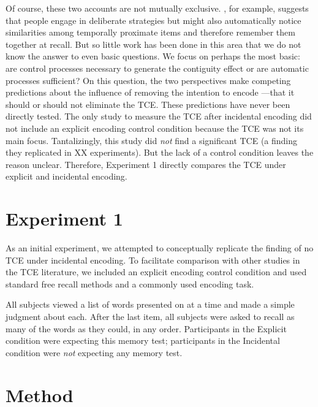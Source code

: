 \documentclass[jou,natbib,floatsintext]{apa6} %
\begin{document}
Of course, these two accounts are not mutually exclusive. \citet{Hint16}, for example, suggests that people engage in deliberate strategies but might also automatically notice similarities among temporally proximate items and therefore remember them together at recall. But so little work has been done in this area that we do not know the answer to even basic questions. We focus on perhaps the most basic: are control processes necessary to generate the contiguity effect or are automatic processes sufficient? On this question, the two perspectives make competing predictions about the influence of removing the intention to encode ---that it should or should not eliminate the TCE. These predictions have never been directly tested. The only study to measure the TCE after incidental encoding \citep{NairEtal17} did not include an explicit encoding control condition because the TCE was not its main focus. Tantalizingly, this study did \emph{not} find a significant TCE (a finding they replicated in XX experiments). But the lack of a control condition leaves the reason unclear. Therefore, Experiment 1 directly compares the TCE under explicit and incidental encoding.




\section{Experiment 1}
As an initial experiment, we attempted to conceptually replicate the \citet{NairEtal17} finding of no TCE under incidental encoding. To facilitate comparison with other studies in the TCE literature, we included an explicit encoding control condition and used standard free recall methods and a commonly used encoding task. 

All subjects viewed a list of words presented on at a time and made a simple judgment about each. After the last item, all subjects were asked to recall as many of the words as they could, in any order. Participants in the Explicit condition were expecting this memory test; participants in the Incidental condition were \emph{not} expecting any memory test. 

\section{Method}

\newcommand\listlength{16} %
\newcommand\presrate{4 seconds} %
\newcommand\isi{1 second} %
\newcommand\DFRDelay{16 second} %
\newcommand\recalltime{75 seconds} %
\newcommand\totalss{XX}
\newcommand\totalexcluded{XX}
\end{document}
